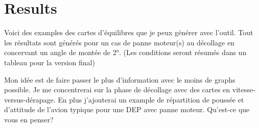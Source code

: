 \section{Results}

Voici des examples des cartes d'équilibres que je peux générer avec l'outil. Tout les résultats sont générés pour un cas de panne moteur(s) au décollage en concervant un angle de montée de 2°. (Les conditions seront résumés dans un tableau pour la version final)

Mon idée est de faire passer le plus d'information avec le moins de graphs possible. Je me concentrerai sur la phase de décollage avec des cartes en vitesse-versus-dérapage. En plus j'ajouterai un example de répartition de poussée et d'attitude de l'avion typique pour une DEP avec panne moteur. Qu'est-ce que vous en penser?

